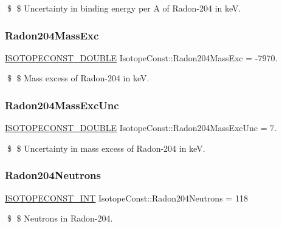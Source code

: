 \$ \$ Uncertainty in binding energy per A of Radon-\/204 in keV. \mbox{\label{group___isotope_const-_radon-_rn204_ga0e55ac5c0826da2580e66443e1c03ce4}} 
\subsubsection{\texorpdfstring{Radon204\+Mass\+Exc}{Radon204MassExc}}
{\footnotesize\ttfamily \mbox{\hyperlink{group___isotope_const-_macros_ga8f45a7272ce02c0b4c65c44636ed719a}{I\+S\+O\+T\+O\+P\+E\+C\+O\+N\+S\+T\+\_\+\+D\+O\+U\+B\+LE}} Isotope\+Const\+::\+Radon204\+Mass\+Exc = -\/7970.}

\$ \$ Mass excess of Radon-\/204 in keV. \mbox{\label{group___isotope_const-_radon-_rn204_ga23c4941f0386c3086e00530fcff85d16}} 
\subsubsection{\texorpdfstring{Radon204\+Mass\+Exc\+Unc}{Radon204MassExcUnc}}
{\footnotesize\ttfamily \mbox{\hyperlink{group___isotope_const-_macros_ga8f45a7272ce02c0b4c65c44636ed719a}{I\+S\+O\+T\+O\+P\+E\+C\+O\+N\+S\+T\+\_\+\+D\+O\+U\+B\+LE}} Isotope\+Const\+::\+Radon204\+Mass\+Exc\+Unc = 7.}

\$ \$ Uncertainty in mass excess of Radon-\/204 in keV. \mbox{\label{group___isotope_const-_radon-_rn204_ga008dd1eaae595deade3e1120d99831ee}} 
\subsubsection{\texorpdfstring{Radon204\+Neutrons}{Radon204Neutrons}}
{\footnotesize\ttfamily \mbox{\hyperlink{group___isotope_const-_macros_ga5f18360b3e99483a35c32d789e62621c}{I\+S\+O\+T\+O\+P\+E\+C\+O\+N\+S\+T\+\_\+\+I\+NT}} Isotope\+Const\+::\+Radon204\+Neutrons = 118}

\$ \$ Neutrons in Radon-\/204. \mbox{\label{group___isotope_const-_radon-_rn204_ga90d1408384f7129e55c6bd6be9f9eff1}} 
